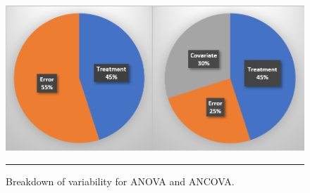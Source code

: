 \begin{figure}[!t]
\centering
  \includegraphics[width=0.95\linewidth]{Images/testA14.png}
  \caption[\small Breakdown of variability for ANOVA and ANCOVA]{\small Breakdown of variability for ANOVA and ANCOVA.}
  \label{fig:testA14}\hrule
\end{figure}
\afterpage{\FloatBarrier}
